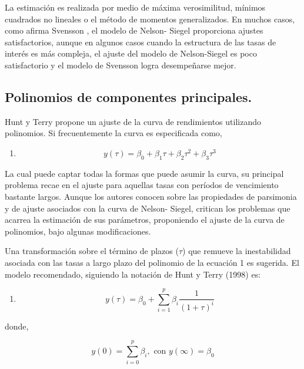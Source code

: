 \documentclass[
  12pt,
]{krantz}
\providecommand{\tightlist}{%
  \setlength{\itemsep}{0pt}\setlength{\parskip}{0pt}}
\begin{document}
La estimación es realizada por medio de máxima verosimilitud, mínimos
cuadrados no lineales o el método de momentos generalizados. En
muchos casos, como afirma Svensson \cite{Sv}, el modelo de Nelson-
Siegel proporciona ajustes satisfactorios, aunque en algunos casos
cuando la estructura de las tasas de interés es más compleja, el ajuste del
modelo de Nelson-Siegel es poco satisfactorio y el modelo de Svensson
logra desempeñarse mejor.

\hypertarget{polinomios-de-componentes-principales.}{%
\subsection{Polinomios de componentes principales.}\label{polinomios-de-componentes-principales.}}

Hunt y Terry \cite{HT} propone un ajuste de la curva de rendimientos
utilizando polinomios. Si frecuentemente la curva es especificada como,

\begin{enumerate}
\def\labelenumi{(\arabic{enumi})}
\tightlist
\item
  \[
  y(\tau) = \beta_{0} + \beta_{1}\tau +\beta_{2}\tau^2 +\beta_{3}\tau^3
  \]
\end{enumerate}

La cual puede captar todas la formas que puede asumir la curva, su
principal problema recae en el ajuste para aquellas tasas con períodos de
vencimiento bastante largos. Aunque los autores conocen sobre las
propiedades de parsimonia y de ajuste asociados con la curva de Nelson-
Siegel, critican los problemas que acarrea la estimación de sus
parámetros, proponiendo el ajuste de la curva de polinomios, bajo
algunas modificaciones.

Una transformación sobre el término de plazos (\(\tau\)) que remueve la
inestabilidad asociada con las tasas a largo plazo del polinomio de la ecuación 1 es
sugerida. El modelo recomendado, siguiendo la notación de Hunt y
Terry (1998) es:

\begin{enumerate}
\def\labelenumi{(\arabic{enumi})}
\setcounter{enumi}{1}
\tightlist
\item
  \[
  y(\tau) = \beta_{0} + \sum_{i=1}^{p} \beta_{i} \frac{1}{(1+\tau)^i}
  \]
\end{enumerate}

donde,

\[\displaystyle{y(0) = \sum_{i=0}^{p}\beta_{i},   \text{ con } y(\infty) = \beta_{0}   }\]
\end{document}
